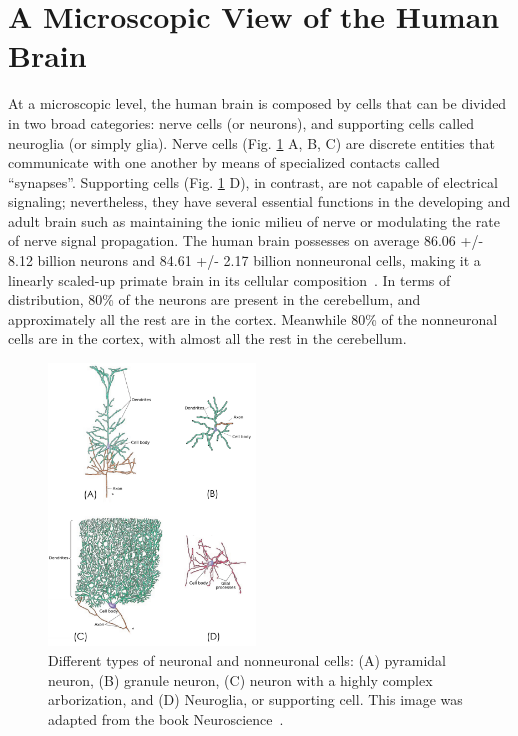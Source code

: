 \section{A Microscopic View of the Human Brain}
At a microscopic level, the human brain is composed by cells that can be
divided in two broad categories: nerve cells (or neurons), and supporting cells
called neuroglia (or simply glia). Nerve cells (Fig. \ref{fig:neuron_types} A, B, C)
are discrete entities that communicate with one another by means of specialized
contacts called “synapses”\cite{Purves2004}. Supporting cells (Fig. \ref{fig:neuron_types} D),
in contrast, are not capable of electrical signaling; nevertheless,
they have several essential functions in the developing and adult brain such
as maintaining the ionic milieu of nerve or modulating the rate of nerve signal
propagation. The human brain possesses on average 86.06 +/- 8.12 billion neurons
and 84.61 +/- 2.17 billion nonneuronal cells, making it a linearly scaled-up
primate brain in its cellular composition~\cite{Azevedo2009}. In terms of
distribution, 80\% of the neurons are present in the cerebellum, and approximately
all the rest are in the cortex. Meanwhile 80\% of the nonneuronal cells are in
the cortex, with almost all the rest in the cerebellum.
% 
\begin{figure}[h]
    \includegraphics[width=0.49\textwidth]{2.neuroanatomy/img/neurons.png}
    \caption{Different types of neuronal and nonneuronal cells: (A) pyramidal
             neuron, (B) granule neuron, (C) neuron with a highly complex
             arborization, and (D) Neuroglia, or supporting cell. This image was adapted from the book Neuroscience~\cite{Purves2004}.}
    \label{fig:neuron_types}
\end{figure}

